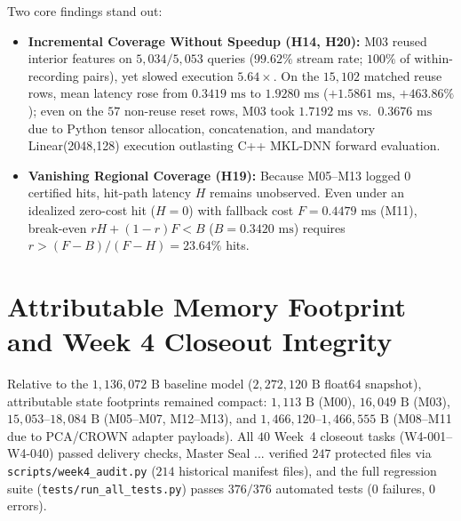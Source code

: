 \documentclass[11pt,oneside,a4paper]{report}
\newcommand{\code}[1]{{\small\upshape\ttfamily #1}}
\theoremstyle{remark}
\begin{document}
Two core findings stand out:
\begin{itemize}[leftmargin=1.5em]
  \item \textbf{Incremental Coverage Without Speedup (\code{H14}, \code{H20}):} \code{M03} reused interior features on $5{,}034/5{,}053$ queries ($99.62\%$ stream rate; $100\%$ of within-recording pairs), yet slowed execution $5.64\times$. On the $15{,}102$ matched reuse rows, mean latency rose from $0.3419\text{ ms}$ to $1.9280\text{ ms}$ ($+1.5861\text{ ms}$, $+463.86\%$); even on the $57$ non-reuse reset rows, \code{M03} took $1.7192\text{ ms}$ vs.\ $0.3676\text{ ms}$ due to Python tensor allocation, concatenation, and mandatory \code{Linear(2048,128)} execution outlasting C++ MKL-DNN forward evaluation.
  \item \textbf{Vanishing Regional Coverage (\code{H19}):} Because \code{M05}--\code{M13} logged $0$ certified hits, hit-path latency $H$ remains unobserved. Even under an idealized zero-cost hit ($H=0$) with fallback cost $F = 0.4479\text{ ms}$ (\code{M11}), break-even $r H + (1-r) F < B$ ($B=0.3420\text{ ms}$) requires $r > (F-B)/(F-H) = 23.64\%$ hits.
\end{itemize}

\section{Attributable Memory Footprint and Week 4 Closeout Integrity}
Relative to the $1{,}136{,}072\text{ B}$ baseline model ($2{,}272{,}120\text{ B}$ \code{float64} snapshot), attributable state footprints remained compact: $1{,}113\text{ B}$ (\code{M00}), $16{,}049\text{ B}$ (\code{M03}), $15{,}053\text{--}18{,}084\text{ B}$ (\code{M05}--\code{M07}, \code{M12}--\code{M13}), and $1{,}466{,}120\text{--}1{,}466{,}555\text{ B}$ (\code{M08}--\code{M11} due to PCA/CROWN adapter payloads). All $40$ Week~4 closeout tasks (\code{W4-001}--\code{W4-040}) passed delivery checks, Master Seal \code{56806762...} verified $247$ protected files via \nolinkurl{scripts/week4_audit.py} ($214$ historical manifest files), and the full regression suite (\nolinkurl{tests/run_all_tests.py}) passes $376/376$ automated tests ($0$ failures, $0$ errors).
\end{document}
